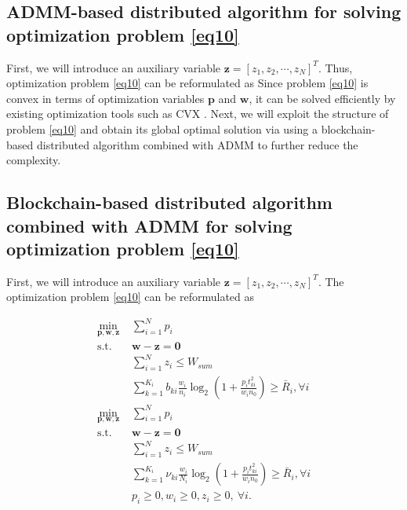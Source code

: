 \documentclass[journal]{IEEEtran}
\begin{document}
\begin{IEEEkeywords}
\subsection{ADMM-based distributed algorithm for solving optimization problem \eqref{eq10}}
First, we will introduce an auxiliary variable $\mathbf{z} = \left[z_1, z_2, \cdots, z_N\right]^T$. Thus, optimization problem \eqref{eq10} can be reformulated as
Since problem \eqref{eq10} is convex in terms of optimization variables $\mathbf{p}$ and $\mathbf{w}$, it can be solved efficiently by existing optimization tools such as CVX \cite{SBoyd1}. Next, we will exploit the structure of problem \eqref{eq10} and obtain its global optimal solution via using a blockchain-based distributed algorithm combined with ADMM \cite{SBoyd2,EChen} to further reduce the complexity.
\subsection{Blockchain-based distributed algorithm combined with ADMM for solving optimization problem \eqref{eq10}}
First, we will introduce an auxiliary variable $\mathbf{z} = \left[z_1, z_2, \cdots, z_N\right]^T$. The optimization problem \eqref{eq10} can be reformulated as

\begin{subequations}\label{eq11}
	\begin{align}
	\min_{\mathbf{p}, \mathbf{w}, \mathbf{z}}\ & \sum\limits_{i = 1}^{N} p_i \label{q11a} \\ \mbox{s.t.} \quad &  \mathbf{w} - \mathbf{z} = \mathbf{0} \label{q11b} \\ \quad &  \sum\limits_{i = 1}^{N}z_i \leq W_{sum} \label{q11c} \\ \quad &  \sum\limits_{k = 1}^{K_i}b_{ki}\frac{w_i}{n_i}\log_2\left(1 + \frac{p_it_{ki}^2}{w_in_0}\right) \geq \bar{R}_i, \forall i \label{q11d}\\
	\min_{\mathbf{p}, \mathbf{w}, \mathbf{z}}\ & \sum\limits_{i = 1}^{N} p_i \label{q11a} \\ \mbox{s.t.} \quad &  \mathbf{w} - \mathbf{z} = \mathbf{0} \label{q11b} \\ \quad &  \sum\limits_{i = 1}^{N}z_i \leq W_{sum} \label{q11c} \\ \quad &  \sum\limits_{k = 1}^{K_i}\nu_{ki}\frac{w_i}{N_i}\log_2\left(1 + \frac{p_it_{ki}^2}{w_in_0}\right) \geq \bar{R}_i, \forall i \label{q11d}\\
	& p_i \geq 0, w_i \geq 0, z_i \geq 0, \ \forall i. \label{q11e}
	\end{align}
\end{subequations}


\end{IEEEkeywords}
\end{document}

